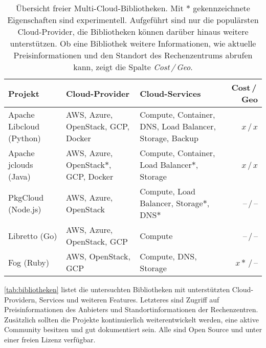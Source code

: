 \begin{table*}\centering
	\begin{minipage}{\textwidth}
	\caption{Übersicht freier Multi-Cloud-Bibliotheken. Mit $*$ gekennzeichnete Eigenschaften sind experimentell. Aufgeführt sind nur die populärsten Cloud-Provider, die Bibliotheken können darüber hinaus weitere unterstützen. Ob eine Bibliothek weitere Informationen, wie aktuelle Preisinformationen und den Standort des Rechenzentrums abrufen kann, zeigt die Spalte \emph{Cost\,/\,Geo}.}
	\begin{tabularx}{\textwidth}{>{\centering}XXXr} \toprule
		Projekt & Cloud-Provider & Cloud-Services & Cost\,/\,Geo\\ \midrule
		Apache Libcloud (Python)\footnotemark & AWS, Azure, OpenStack, GCP, Docker & Compute, Container, DNS, Load Balancer, Storage, Backup & $x$\,/\,$x$\\
		Apache jclouds (Java)\footnotemark & AWS, Azure, Open\-Stack$*$, GCP, Docker & Compute, Container, Load Balancer$*$, Storage & $x$\,/\,$x$\\
		PkgCloud (Node.js)\footnotemark & AWS, Azure, OpenStack& Compute, Load Balancer, Storage$*$, DNS$*$ & --\,/\,--\\
		Libretto (Go)\footnotemark & AWS, Azure, OpenStack, GCP & Compute & --\,/\,--\\
		Fog (Ruby)\footnotemark & AWS, OpenStack, GCP & Compute, DNS, Storage & $x*$\,/\,--\\
		\bottomrule
	\end{tabularx}
	\label{tab:bibliotheken}
	\vspace{150pt}
\end{minipage}  
\end{table*}

\autoref*{tab:bibliotheken} listet die untersuchten Bibliotheken mit unterstützten Cloud-Providern, Services und weiteren Features. Letzteres sind Zugriff auf Preisinformationen des Anbieters und Standortinformationen der Rechenzentren. Zusätzlich sollten die Projekte kontinuierlich weiterentwickelt werden, eine aktive Community besitzen und gut dokumentiert sein. Alle sind Open Source und unter einer freien Lizenz verfügbar.

